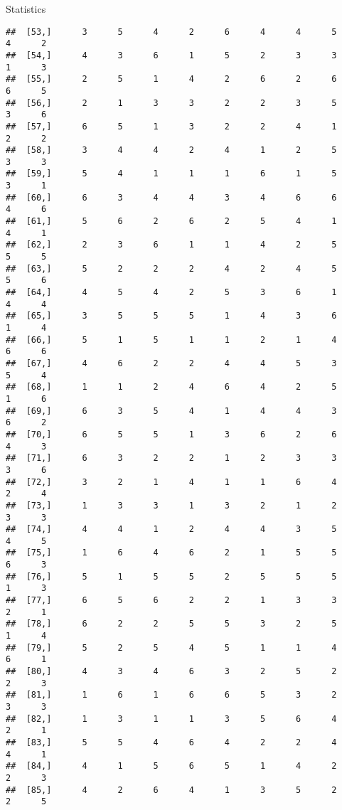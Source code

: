 \documentclass[
  ignorenonframetext,
]{beamer}
\begin{document}
\begin{frame}[fragile]{Statistics}
\begin{verbatim}
##  [53,]      3      5      4      2      6      4      4      5      4      2
##  [54,]      4      3      6      1      5      2      3      3      1      3
##  [55,]      2      5      1      4      2      6      2      6      6      5
##  [56,]      2      1      3      3      2      2      3      5      3      6
##  [57,]      6      5      1      3      2      2      4      1      2      2
##  [58,]      3      4      4      2      4      1      2      5      3      3
##  [59,]      5      4      1      1      1      6      1      5      3      1
##  [60,]      6      3      4      4      3      4      6      6      4      6
##  [61,]      5      6      2      6      2      5      4      1      4      1
##  [62,]      2      3      6      1      1      4      2      5      5      5
##  [63,]      5      2      2      2      4      2      4      5      5      6
##  [64,]      4      5      4      2      5      3      6      1      4      4
##  [65,]      3      5      5      5      1      4      3      6      1      4
##  [66,]      5      1      5      1      1      2      1      4      6      6
##  [67,]      4      6      2      2      4      4      5      3      5      4
##  [68,]      1      1      2      4      6      4      2      5      1      6
##  [69,]      6      3      5      4      1      4      4      3      6      2
##  [70,]      6      5      5      1      3      6      2      6      4      3
##  [71,]      6      3      2      2      1      2      3      3      3      6
##  [72,]      3      2      1      4      1      1      6      4      2      4
##  [73,]      1      3      3      1      3      2      1      2      3      3
##  [74,]      4      4      1      2      4      4      3      5      4      5
##  [75,]      1      6      4      6      2      1      5      5      6      3
##  [76,]      5      1      5      5      2      5      5      5      1      3
##  [77,]      6      5      6      2      2      1      3      3      2      1
##  [78,]      6      2      2      5      5      3      2      5      1      4
##  [79,]      5      2      5      4      5      1      1      4      6      1
##  [80,]      4      3      4      6      3      2      5      2      2      3
##  [81,]      1      6      1      6      6      5      3      2      3      3
##  [82,]      1      3      1      1      3      5      6      4      2      1
##  [83,]      5      5      4      6      4      2      2      4      4      1
##  [84,]      4      1      5      6      5      1      4      2      2      3
##  [85,]      4      2      6      4      1      3      5      2      2      5

\end{verbatim}
\end{frame}
\end{document}
